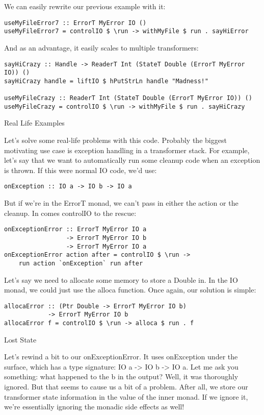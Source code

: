 We can easily rewrite our previous example with it:

\begin{lstlisting}
useMyFileError7 :: ErrorT MyError IO ()
useMyFileError7 = controlIO $ \run -> withMyFile $ run . sayHiError
\end{lstlisting}

And as an advantage, it easily scales to multiple transformers:

\begin{lstlisting}
sayHiCrazy :: Handle -> ReaderT Int (StateT Double (ErrorT MyError IO)) ()
sayHiCrazy handle = liftIO $ hPutStrLn handle "Madness!"

useMyFileCrazy :: ReaderT Int (StateT Double (ErrorT MyError IO)) ()
useMyFileCrazy = controlIO $ \run -> withMyFile $ run . sayHiCrazy
\end{lstlisting}

Real Life Examples

Let's solve some real-life problems with this code. Probably the biggest motivating use case is exception handling in a transformer stack. For example, let's say that we want to automatically run some cleanup code when an exception is thrown. If this were normal IO code, we'd use:

\begin{lstlisting}
onException :: IO a -> IO b -> IO a
\end{lstlisting}

But if we're in the ErrorT monad, we can't pass in either the action or the cleanup. In comes controlIO to the rescue:

\begin{lstlisting}
onExceptionError :: ErrorT MyError IO a
                 -> ErrorT MyError IO b
                 -> ErrorT MyError IO a
onExceptionError action after = controlIO $ \run ->
    run action `onException` run after
\end{lstlisting}

Let's say we need to allocate some memory to store a Double in. In the IO monad, we could just use the alloca function. Once again, our solution is simple:

\begin{lstlisting}
allocaError :: (Ptr Double -> ErrorT MyError IO b)
            -> ErrorT MyError IO b
allocaError f = controlIO $ \run -> alloca $ run . f
\end{lstlisting}

Lost State

Let's rewind a bit to our onExceptionError. It uses onException under the surface, which has a type signature: IO a -> IO b -> IO a. Let me ask you something: what happened to the b in the output? Well, it was thoroughly ignored. But that seems to cause us a bit of a problem. After all, we store our transformer state information in the value of the inner monad. If we ignore it, we're essentially ignoring the monadic side effects as well!

